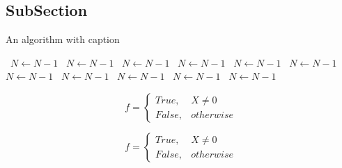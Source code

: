 \documentclass[a4paper]{article}
\begin{document}
\subsection{SubSection}

\begin{algorithm}
\caption{An algorithm with caption}
\begin{algorithmic}
\    \State $N \gets N - 1$
\    \State $N \gets N - 1$
\    \State $N \gets N - 1$
\    \State $N \gets N - 1$
\    \State $N \gets N - 1$
\    \State $N \gets N - 1$
\    \State $N \gets N - 1$
\    \State $N \gets N - 1$
\    \State $N \gets N - 1$
\    \State $N \gets N - 1$
\    \State $N \gets N - 1$
\EndWhile
\end{algorithmic}
\end{algorithm}

\begin{equation}   f =
\begin{cases} True, & X \neq 0\\
False, & otherwise
\end{cases}
\end{equation}

\begin{equation}   f =
\begin{cases} True, & X \neq 0\\
False, & otherwise
\end{cases}
\end{equation}
\end{document}
